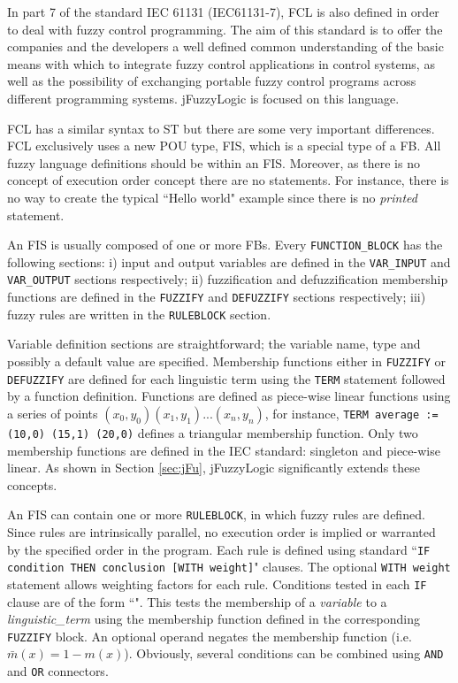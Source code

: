 \documentclass[11pt,twoside]{article}
\begin{document}
\begin{multicols}{2}
In part 7 of the standard IEC 61131 (IEC61131-7), FCL is also defined in order to deal with fuzzy control programming. The aim of this standard is to offer the companies and the developers a well defined common understanding of the basic means with which to integrate fuzzy control applications in control systems, as well as the possibility of exchanging portable fuzzy control programs across different programming systems. jFuzzyLogic is focused on this language.

FCL has a similar syntax to ST but there are some very important differences. FCL exclusively uses a new POU type, FIS, which is a special type of a FB. All fuzzy language definitions should be within an FIS. Moreover, as there is no concept of execution order concept there are no statements. For instance, there is no way to create the typical ``Hello world" example since there is no \textit{printed} statement. 

An FIS is usually composed of one or more FBs. Every \texttt{FUNCTION\_BLOCK} has the following sections: i) input and output variables are defined in the \texttt{VAR\_INPUT} and \texttt{VAR\_OUTPUT} sections respectively; ii) fuzzification and defuzzification membership functions are defined in the \texttt{FUZZIFY} and \texttt{DEFUZZIFY} sections respectively; iii) fuzzy rules are written in the \texttt{RULEBLOCK} section.

Variable definition sections are straightforward; the variable name, type and possibly a default value are specified. Membership functions either in \texttt{FUZZIFY} or \texttt{DEFUZZIFY} are defined for each linguistic term using the \texttt{TERM} statement followed by a function definition. Functions are defined as piece-wise linear functions using a series of points $(x_0,y_0) (x_1,y_1) ... (x_n, y_n)$, for instance, \texttt{TERM average := (10,0) (15,1) (20,0)} defines a triangular membership function. Only two membership functions are defined in the IEC standard: singleton and piece-wise linear. As shown in Section \ref{sec:jFu}, jFuzzyLogic significantly extends these concepts.

An FIS can contain one or more \texttt{RULEBLOCK}, in which fuzzy rules are defined. Since rules are intrinsically parallel, no execution order is implied or warranted by the specified order in the program. Each rule is defined using standard ``\texttt{IF condition THEN conclusion  [WITH weight]}" clauses. The optional \texttt{WITH weight} statement allows weighting factors for each rule. Conditions tested in each \texttt{IF} clause are of the form ``". This tests the membership of a \textit{variable} to a \textit{linguistic\_term} using the membership function defined in the corresponding \texttt{FUZZIFY} block. An optional  operand negates the membership function (i.e. $\bar{m}(x) = 1 - m(x)$). Obviously, several conditions can be combined using \texttt{AND} and \texttt{OR} connectors.


\end{multicols}
\end{document}
